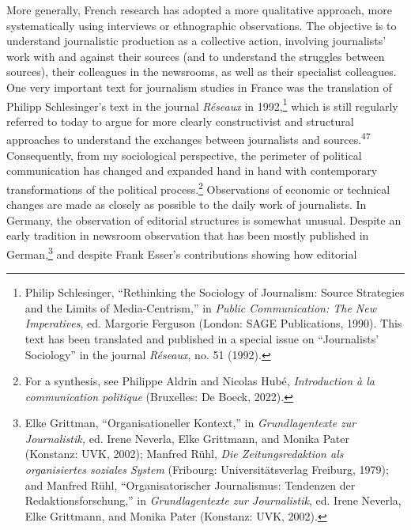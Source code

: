\documentclass{tufte-handout}
\begin{document}
More generally, French research has adopted a more qualitative approach,
more systematically using interviews or ethnographic observations. The
objective is to understand journalistic production as a collective
action, involving journalists' work with and against their sources (and
to understand the struggles between sources), their colleagues in the
newsrooms, as well as their specialist colleagues. One very important
text for journalism studies in France was the translation of Philipp
Schlesinger's text in the journal \emph{Réseaux} in 1992,\footnote{Philip
  Schlesinger, ``Rethinking the Sociology of Journalism: Source
  Strategies and the Limits of Media-Centrism,'' in \emph{Public
  Communication: The New Imperatives}, ed. Margorie Ferguson (London:
  SAGE Publications, 1990). This text has been translated and published
  in a special issue on ``Journalists' Sociology'' in the journal
  \emph{Réseaux}, no. 51 (1992).} which is still regularly referred to
today to argue for more clearly constructivist and structural approaches
to understand the exchanges between journalists and sources.\textsuperscript{47}
Consequently, from my sociological perspective, the perimeter of
political communication has changed and expanded hand in hand with
contemporary transformations of the political process.\footnote{For a
  synthesis, see Philippe Aldrin and Nicolas Hubé, \emph{Introduction à
  la communication politique} (Bruxelles: De Boeck, 2022).} Observations
of economic or technical changes are made as closely as possible to the
daily work of journalists. In Germany, the observation of editorial
structures is somewhat unusual. Despite an early tradition in newsroom
observation that has been mostly published in German,\footnote{Elke
  Grittman, ``Organisationeller Kontext,'' in \emph{Grundlagentexte zur
  Journalistik,} ed. Irene Neverla, Elke Grittmann, and Monika Pater
  (Konstanz: UVK, 2002); Manfred Rühl, \emph{Die Zeitungsredaktion als
  organisiertes soziales System} (Fribourg: Universitätsverlag Freiburg,
  1979); and Manfred Rühl, ``Organisatorischer Journalismus: Tendenzen
  der Redaktionsforschung,'' in \emph{Grundlagentexte zur Journalistik},
  ed. Irene Neverla, Elke Grittmann, and Monika Pater (Konstanz: UVK,
  2002).} and despite Frank Esser's contributions showing how editorial
\end{document}
